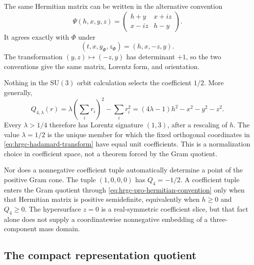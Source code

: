 The same Hermitian matrix can be written in the alternative convention
\begin{equation}
 \Psi(h,x,y,z)=
 \begin{pmatrix}h+y&x+iz\\x-iz&h-y\end{pmatrix}.
 \label{eq:hrgc-pro-hermitian-convention}
\end{equation}
It agrees exactly with \(\Phi\) under
\[
 (t,x,y_{\Phi},z_{\Phi})=(h,x,-z,y).
\]
The transformation \((y,z)\mapsto(-z,y)\) has determinant \(+1\), so the
two conventions give the same matrix, Lorentz form, and orientation.

Nothing in the \(\mathrm{SU}(3)\) orbit calculation selects the coefficient
\(1/2\).  More generally,
\begin{equation}
 Q_{4,\lambda}(r)=\lambda\left(\sum_ir_i\right)^2-\sum_ir_i^2
 =(4\lambda-1)h^2-x^2-y^2-z^2.
 \label{eq:hrgc-q4-lambda-family}
\end{equation}
Every \(\lambda>1/4\) therefore has Lorentz signature \((1,3)\), after a
rescaling of \(h\).  The value \(\lambda=1/2\) is the unique member for which
the fixed orthogonal coordinates in \eqref{eq:hrgc-hadamard-transform} have
equal unit coefficients.  This is a normalization choice in coefficient
space, not a theorem forced by the Gram quotient.

Nor does a nonnegative coefficient tuple automatically determine a point of
the positive Gram cone.  The tuple \((1,0,0,0)\) has
\(Q_4=-1/2\).  A coefficient tuple enters the Gram quotient through
\eqref{eq:hrgc-pro-hermitian-convention} only when that Hermitian matrix is
positive semidefinite, equivalently when \(h\geq0\) and \(Q_4\geq0\).
The hypersurface \(z=0\) is a real-symmetric coefficient slice, but that
fact alone does not supply a coordinatewise nonnegative embedding of a
three-component mass domain.

\subsection{The compact representation quotient}

